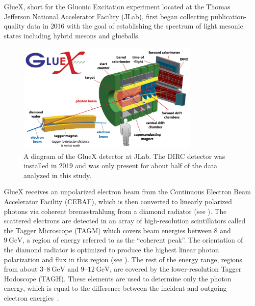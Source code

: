 GlueX, short for the Gluonic Excitation experiment located at the Thomas Jefferson National Accelerator Facility (JLab), first began collecting publication-quality data in 2016 with the goal of establishing the spectrum of light mesonic states including hybrid mesons and glueballs.

\begin{figure}
  \begin{center}
    \includegraphics[width=0.8\textwidth]{figures/gluex_detector.png}
  \end{center}
  \caption{A diagram of the GlueX detector at JLab. The DIRC detector was installed in 2019 and was only present for about half of the data analyzed in this study.}\label{fig:gluex-detector}
\end{figure}

GlueX receives an unpolarized electron beam from the Continuous Electron Beam Accelerator Facility (CEBAF), which is then converted to linearly polarized photons via coherent bremsstrahlung from a diamond radiator (see ). The scattered electrons are detected in an array of high-resolution scintillators called the Tagger Microscope (TAGM) which covers beam energies between $8$ and $\SI{9}{\giga\eV}$, a region of energy referred to as the ``coherent peak''. The orientation of the diamond radiator is optimized to produce the highest linear photon polarization and flux in this region (see ). The rest of the energy range, regions from about $3$--$\SI{8}{\giga\eV}$ and $9$--$\SI{12}{\giga\eV}$, are covered by the lower-resolution Tagger Hodoscope (TAGH). These elements are used to determine only the photon energy, which is equal to the difference between the incident and outgoing electron energies~\cite{Adhikari2021}.


